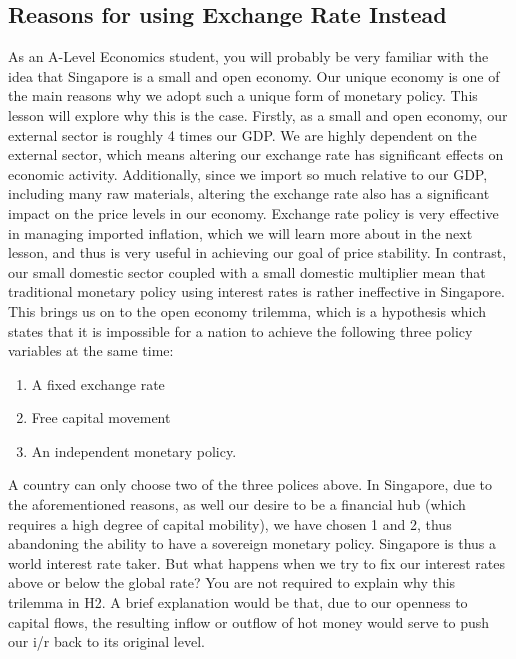 \documentclass[DIV=classic,11pt,numbers=noenddot,listof=totoc,bibliography=totoc,parskip]{scrartcl}
\begin{document}
\subsection{Reasons for using Exchange Rate Instead}
As an A-Level Economics student, you will probably be very familiar with the idea that Singapore is a small and open economy. Our unique economy is one of the main reasons why we adopt such a unique form of monetary policy. This lesson will explore why this is the case. Firstly, as a small and open economy, our external sector is roughly 4 times our GDP. We are highly dependent on the external sector, which means altering our exchange rate has significant effects on economic activity. Additionally, since we import so much relative to our GDP, including many raw materials, altering the exchange rate also has a significant impact on the price levels in our economy. Exchange rate policy is very effective in managing imported inflation, which we will learn more about in the next lesson, and thus is very useful in achieving our goal of price stability. In contrast, our small domestic sector coupled with a small domestic multiplier mean that traditional monetary policy using interest rates is rather ineffective in Singapore. This brings us on to the open economy trilemma, which is a hypothesis which states that it is impossible for a nation to achieve the following three policy variables at the same time:
\begin{enumerate}
\item A fixed exchange rate
\item Free capital movement
\item An independent monetary policy.
\end{enumerate}
A country can only choose two of the three polices above. In Singapore, due to the aforementioned reasons, as well our desire to be a financial hub (which requires a high degree of capital mobility), we have chosen 1 and 2, thus abandoning the ability to have a sovereign monetary policy. Singapore is thus a world interest rate taker. But what happens when we try to fix our interest rates above or below the global rate?  You are not required to explain why this trilemma in H2. A brief explanation would be that, due to our openness to capital flows, the resulting inflow or outflow of hot money would serve to push our i/r back to its original level.
\end{document}
